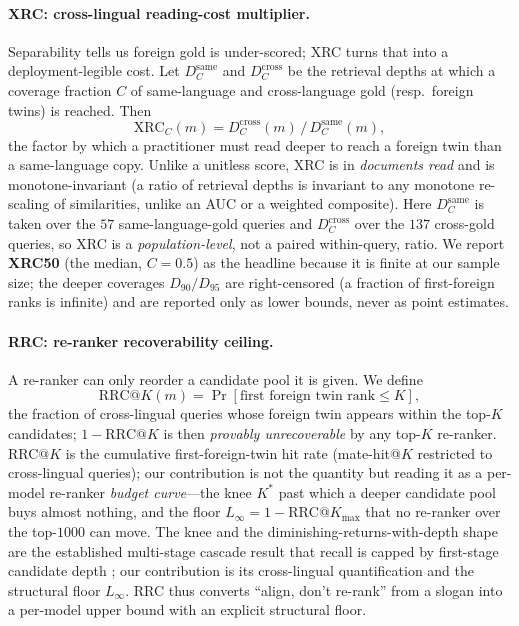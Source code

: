 \documentclass[11pt]{article}
\begin{document}
\paragraph{XRC: cross-lingual reading-cost multiplier.}
Separability tells us foreign gold is under-scored; XRC turns that into a
deployment-legible cost. Let $D_C^{\text{same}}$ and $D_C^{\text{cross}}$ be the
retrieval depths at which a coverage fraction $C$ of same-language and
cross-language gold (resp.\ foreign twins) is reached. Then
\begin{equation}
\label{eq:xrc}
\mathrm{XRC}_C(m) = D_C^{\text{cross}}(m) \,/\, D_C^{\text{same}}(m),
\end{equation}
the factor by which a practitioner must read deeper to reach a foreign twin than
a same-language copy. Unlike a unitless score, XRC is in \emph{documents read}
and is monotone-invariant (a ratio of retrieval depths is invariant to any
monotone re-scaling of similarities, unlike an AUC or a weighted composite).
Here $D^{\text{same}}_C$ is taken over the $57$ same-language-gold queries and
$D^{\text{cross}}_C$ over the $137$ cross-gold queries, so XRC is a
\emph{population-level}, not a paired within-query, ratio. We report
\textbf{XRC50} (the median, $C{=}0.5$) as the headline because it is finite at
our sample size; the deeper coverages $D_{90}/D_{95}$ are right-censored (a
fraction of first-foreign ranks is infinite) and are reported only as lower
bounds, never as point estimates.

\paragraph{RRC: re-ranker recoverability ceiling.}
A re-ranker can only reorder a candidate pool it is given. We define
\begin{equation}
\label{eq:rrc}
\mathrm{RRC@}K(m) = \Pr\!\left[\text{first foreign twin rank} \le K\right],
\end{equation}
the fraction of cross-lingual queries whose foreign twin appears within the
top-$K$ candidates; $1-\mathrm{RRC@}K$ is then \emph{provably unrecoverable} by
any top-$K$ re-ranker. RRC@$K$ is the cumulative first-foreign-twin hit rate
(mate-hit@$K$ restricted to cross-lingual queries); our contribution is not the
quantity but reading it as a per-model re-ranker \emph{budget curve}---the knee
$K^{\!*}$ past which a deeper candidate pool buys almost nothing, and the floor
$L_\infty = 1-\mathrm{RRC@}K_{\max}$ that no re-ranker over the top-$1000$ can
move. The knee and the diminishing-returns-with-depth shape are the established
multi-stage cascade result that recall is capped by first-stage candidate depth
\citep{nogueira2019multistage,gao2021rethink}; our contribution is its
cross-lingual quantification and the structural floor $L_\infty$. RRC thus
converts ``align, don't re-rank'' from a slogan into a per-model upper bound with
an explicit structural floor.
\end{document}
